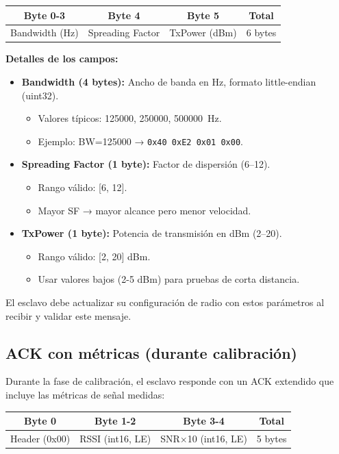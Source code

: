 \documentclass[11pt,a4paper]{article}
\begin{document}
\begin{center}
\begin{tabular}{|c|c|c|c|}
\hline
\textbf{Byte 0-3} & \textbf{Byte 4} & \textbf{Byte 5} & \textbf{Total} \\
\hline
Bandwidth (Hz) & Spreading Factor & TxPower (dBm) & 6 bytes \\
\hline
\end{tabular}
\end{center}

\noindent\textbf{Detalles de los campos:}
\begin{itemize}
  \item \textbf{Bandwidth (4 bytes):} Ancho de banda en Hz, formato little-endian (uint32).
    \begin{itemize}
      \item Valores típicos: 125000, 250000, 500000~Hz.
      \item Ejemplo: BW=125000 → \texttt{0x40 0xE2 0x01 0x00}.
    \end{itemize}
  \item \textbf{Spreading Factor (1 byte):} Factor de dispersión (6--12).
    \begin{itemize}
      \item Rango válido: [6, 12].
      \item Mayor SF → mayor alcance pero menor velocidad.
    \end{itemize}
  \item \textbf{TxPower (1 byte):} Potencia de transmisión en dBm (2--20).
    \begin{itemize}
      \item Rango válido: [2, 20] dBm.
      \item Usar valores bajos (2-5 dBm) para pruebas de corta distancia.
    \end{itemize}
\end{itemize}

\noindent El esclavo debe actualizar su configuración de radio con estos parámetros al recibir y validar este mensaje.

\subsection{ACK con métricas (durante calibración)}
Durante la fase de calibración, el esclavo responde con un ACK extendido que incluye las métricas de señal medidas:

\begin{center}
\begin{tabular}{|c|c|c|c|}
\hline
\textbf{Byte 0} & \textbf{Byte 1-2} & \textbf{Byte 3-4} & \textbf{Total} \\
\hline
Header (0x00) & RSSI (int16, LE) & SNR$\times$10 (int16, LE) & 5 bytes \\
\hline
\end{tabular}
\end{center}
\end{document}
